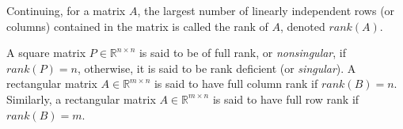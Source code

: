 Continuing, for a matrix $A$, the largest number of linearly independent rows (or columns) contained in the matrix is called the rank of $A$, denoted $rank(A)$. 

A square matrix $P\in\mathbb{R}^{n\times n}$ is said to be of full rank, or \textit{nonsingular}, if $rank(P)=n$, otherwise, it is said to be rank deficient (or \textit{singular}). A rectangular matrix $A\in\mathbb{R}^{m\times n}$ is said to have full column rank if $rank(B)=n$. Similarly, a rectangular matrix $A\in\mathbb{R}^{m\times n}$ is said to have full row rank if $rank(B)=m$. 


